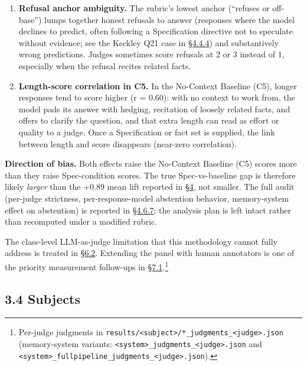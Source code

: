 \begin{enumerate}
\def\labelenumi{\arabic{enumi}.}
\tightlist
\item
  \textbf{Refusal anchor ambiguity.} The rubric's lowest anchor
  (``refuses or off-base'') lumps together honest refusals to answer
  (responses where the model declines to predict, often following a
  Specification directive not to speculate without evidence; see the
  Keckley Q21 case in \hyperref[case-study-cross-system-refusal-on-keckley-q21]{§4.4.4}) and substantively wrong predictions.
  Judges sometimes score refusals at 2 or 3 instead of 1, especially
  when the refusal recites related facts.
\item
  \textbf{Length-score correlation in C5.} In the No-Context Baseline
  (C5), longer responses tend to score higher (r = 0.60): with no
  context to work from, the model pads its answer with hedging,
  recitation of loosely related facts, and offers to clarify the
  question, and that extra length can read as effort or quality to a
  judge. Once a Specification or fact set is supplied, the link between
  length and score disappears (near-zero correlation).
\end{enumerate}

\textbf{Direction of bias.} Both effects raise the No-Context Baseline
(C5) scores more than they raise Spec-condition scores. The true
Spec-vs-baseline gap is therefore likely \emph{larger} than the +0.89
mean lift reported in \hyperref[results]{§4}, not smaller. The full audit (per-judge
strictness, per-response-model abstention behavior, memory-system effect
on abstention) is reported in \hyperref[rubric-handling-limitations-post-hoc-validity-audit-1]{§4.6.7}; the analysis plan is left intact
rather than recomputed under a modified rubric.

The class-level LLM-as-judge limitation that this methodology cannot
fully address is treated in \hyperref[measurement-apparatus]{§6.2}. Extending the panel with human
annotators is one of the priority measurement follow-ups in
\hyperref[subject-and-corpus-expansion]{§7.1}.\footnote{Per-judge judgments in
  \texttt{results/\textless{}subject\textgreater{}/*\_judgments\_\textless{}judge\textgreater{}.json}
  (memory-system variants:
  \texttt{\textless{}system\textgreater{}\_judgments\_\textless{}judge\textgreater{}.json}
  and
  \texttt{\textless{}system\textgreater{}\_fullpipeline\_judgments\_\textless{}judge\textgreater{}.json}).}

\hypertarget{subjects}{%
\subsection{3.4 Subjects}\label{subjects}}


